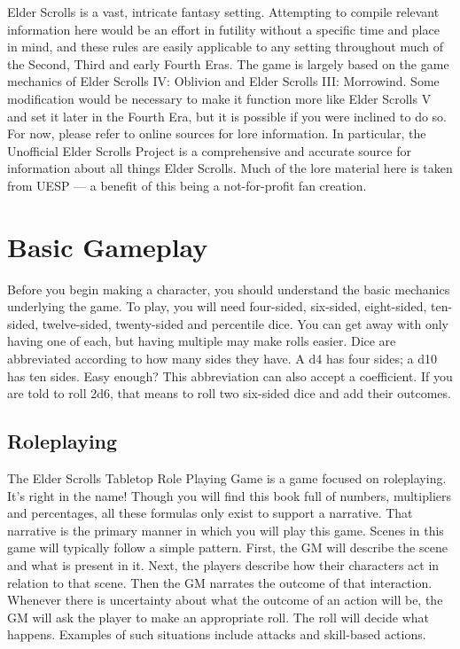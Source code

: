 \documentclass[12pt]{book}
\begin{document}
Elder Scrolls is a vast, intricate fantasy setting. Attempting to compile relevant information here would be an effort in futility without a specific time and place in mind, and these rules are easily applicable to any setting throughout much of the Second, Third and early Fourth Eras. The game is largely based on the game mechanics of Elder Scrolls IV: Oblivion and Elder Scrolls III: Morrowind. Some modification would be necessary to make it function more like Elder Scrolls V and set it later in the Fourth Era, but it is possible if you were inclined to do so. For now, please refer to online sources for lore information. In particular, the Unofficial Elder Scrolls Project is a comprehensive and accurate source for information about all things Elder Scrolls. Much of the lore material here is taken from UESP --- a benefit of this being a not-for-profit fan creation.

\tableofcontents

\chapter{Basic Gameplay}
Before you begin making a character, you should understand the basic mechanics underlying the game. To play, you will need four-sided, six-sided, eight-sided, ten-sided, twelve-sided, twenty-sided and percentile dice. You can get away with only having one of each, but having multiple may make rolls easier. Dice are abbreviated according to how many sides they have. A d4 has four sides; a d10 has ten sides. Easy enough? This abbreviation can also accept a coefficient. If you are told to roll 2d6, that means to roll two six-sided dice and add their outcomes.

\section{Roleplaying}
The Elder Scrolls Tabletop Role Playing Game is a game focused on roleplaying. It's right in the name! Though you will find this book full of numbers, multipliers and percentages, all these formulas only exist to support a narrative. That narrative is the primary manner in which you will play this game.
Scenes in this game will typically follow a simple pattern. First, the GM will describe the scene and what is present in it. Next, the players describe how their characters act in relation to that scene. Then the GM narrates the outcome of that interaction. Whenever there is uncertainty about what the outcome of an action will be, the GM will ask the player to make an appropriate roll. The roll will decide what happens. Examples of such situations include attacks and skill-based actions.
\end{document}
